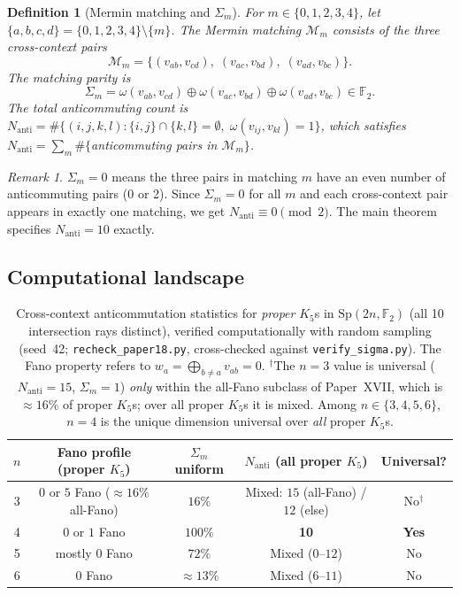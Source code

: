 \documentclass[11pt,a4paper]{article}
\newtheorem{definition}[theorem]{Definition}
\theoremstyle{remark}
\newtheorem{remark}[theorem]{Remark}
\newcommand{\Sp}{\mathrm{Sp}}
\begin{document}
\begin{definition}[Mermin matching and $\Sigma_m$]
For $m \in \{0,1,2,3,4\}$, let $\{a,b,c,d\} = \{0,1,2,3,4\} \setminus \{m\}$.
The \emph{Mermin matching} $\mathcal{M}_m$ consists of the three cross-context pairs
\[
  \mathcal{M}_m
  = \bigl\{ (v_{ab},v_{cd}),\; (v_{ac},v_{bd}),\; (v_{ad},v_{bc}) \bigr\}.
\]
The \emph{matching parity} is
\[
  \Sigma_m
  = \omega(v_{ab},v_{cd}) \oplus \omega(v_{ac},v_{bd}) \oplus \omega(v_{ad},v_{bc})
  \in \mathbb{F}_2.
\]
The total anticommuting count is
$N_{\mathrm{anti}} = \#\{(i,j,k,l) : \{i,j\}\cap\{k,l\}=\emptyset,\;
\omega(v_{ij},v_{kl})=1\}$,
which satisfies $N_{\mathrm{anti}} = \sum_m \#\{$anticommuting pairs in $\mathcal{M}_m\}$.
\end{definition}

\begin{remark}
$\Sigma_m = 0$ means the three pairs in matching $m$ have an even number of
anticommuting pairs (0 or 2).
Since $\Sigma_m = 0$ for all $m$ and each cross-context pair appears in
exactly one matching, we get $N_{\mathrm{anti}} \equiv 0 \pmod{2}$.
The main theorem specifies $N_{\mathrm{anti}} = 10$ exactly.
\end{remark}

\subsection{Computational landscape}

\begin{table}[H]
\centering
\small
\begin{tabular}{ccccc}
\toprule
$n$ & Fano profile (proper $K_5$) & $\Sigma_m$ uniform & $N_{\mathrm{anti}}$ (all proper $K_5$) & Universal? \\
\midrule
3 & $0$ or $5$ Fano ($\approx 16\%$ all-Fano) & $16\%$ & Mixed: $15$ (all-Fano) / $12$ (else) & No$^\dagger$ \\
4 & $0$ or $1$ Fano & $100\%$ & \textbf{10} & \textbf{Yes} \\
5 & mostly $0$ Fano & $72\%$ & Mixed ($0$--$12$) & No \\
6 & $0$ Fano & $\approx 13\%$ & Mixed ($6$--$11$) & No \\
\bottomrule
\end{tabular}
\caption{Cross-context anticommutation statistics for \emph{proper} $K_5$s in
$\Sp(2n, \mathbb{F}_2)$ (all 10 intersection rays distinct), verified
computationally with random sampling (seed~42; \texttt{recheck\_paper18.py},
cross-checked against \texttt{verify\_sigma.py}). The Fano property refers to
$w_a = \bigoplus_{b \neq a} v_{ab} = 0$.
$^\dagger$The $n=3$ value is universal ($N_{\mathrm{anti}}=15$, $\Sigma_m=1$)
\emph{only} within the all-Fano subclass of Paper~XVII, which is $\approx 16\%$ of
proper $K_5$s; over all proper $K_5$s it is mixed. Among $n \in \{3,4,5,6\}$,
$n=4$ is the unique dimension universal over \emph{all} proper $K_5$s.}
\label{tab:landscape}
\end{table}
\end{document}
